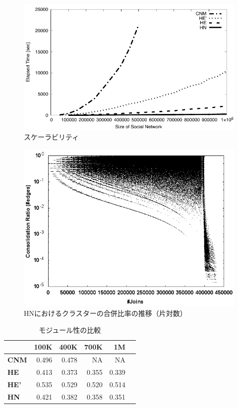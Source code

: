 \documentclass [a4j,11pt] {jsarticle}
\begin{document}
\begin {figure}[htbp]
  \centerline {\includegraphics [width=0.80\linewidth]{fig5-all-etime-size.pdf}}
  \caption {スケーラビリティ}
  \label {fig: scalability}
\end{figure}

\begin {figure}[htbp]
  \centerline {\includegraphics [width=0.80\linewidth]{fig7-hn-ratio-join-500K.png}}
  \caption {HNにおけるクラスターの合併比率の推移（片対数）}
  \label {fig: cluster move}
\end{figure}

\begin {table}
  \caption {モジュール性の比較}
  \label {tbl: compete module}
  \begin {center}
    \begin {tabular}{lrrrrr} \\ \hline
          & 100K & 400K & 700K & 1M \\ \hline
      \textbf {CNM}& 0.496 & 0.478 & NA & NA \\
      \textbf {HE}  & 0.413  & 0.373  & 0.355  & 0.339 \\
      \textbf {HE'} & 0.535  & 0.529 & 0.520 & 0.514 \\
      \textbf {HN}  & 0.421 & 0.382 & 0.358  & 0.351 \\
      \hline
    \end {tabular}
  \end {center}
\end {table}
\end{document}
